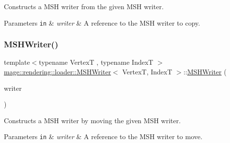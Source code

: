 Constructs a M\+SH writer from the given M\+SH writer.


\begin{DoxyParams}[1]{Parameters}
\mbox{\tt in}  & {\em writer} & A reference to the M\+SH writer to copy. \\
\hline
\end{DoxyParams}
\mbox{\label{classmage_1_1rendering_1_1loader_1_1_m_s_h_writer_a877a042ef1a4472c9d1cece846b2a70a}} 
\subsubsection{\texorpdfstring{M\+S\+H\+Writer()}{MSHWriter()}\hspace{0.1cm}{\footnotesize\ttfamily [3/3]}}
{\footnotesize\ttfamily template$<$typename VertexT , typename IndexT $>$ \\
\mbox{\hyperlink{classmage_1_1rendering_1_1loader_1_1_m_s_h_writer}{mage\+::rendering\+::loader\+::\+M\+S\+H\+Writer}}$<$ VertexT, IndexT $>$\+::\mbox{\hyperlink{classmage_1_1rendering_1_1loader_1_1_m_s_h_writer}{M\+S\+H\+Writer}} (\begin{DoxyParamCaption}\item[{\mbox{\hyperlink{classmage_1_1rendering_1_1loader_1_1_m_s_h_writer}{M\+S\+H\+Writer}}$<$ VertexT, IndexT $>$ \&\&}]{writer }\end{DoxyParamCaption})\hspace{0.3cm}{\ttfamily [noexcept]}}

Constructs a M\+SH writer by moving the given M\+SH writer.


\begin{DoxyParams}[1]{Parameters}
\mbox{\tt in}  & {\em writer} & A reference to the M\+SH writer to move. \\
\hline
\end{DoxyParams}
\mbox{\label{classmage_1_1rendering_1_1loader_1_1_m_s_h_writer_ae2ead8892a1818c59d55a7a5ecdf50b3}} 
